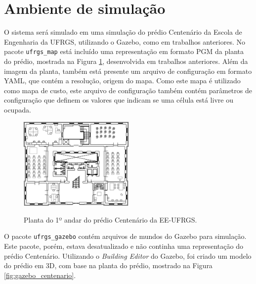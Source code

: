 \documentclass[repeatfields,xlists,xpacks,oneside,yearsonly]{ufrgscca}
\begin{document}
\section{Ambiente de simulação}

O sistema será simulado em uma simulação do prédio Centenário da Escola de Engenharia
da UFRGS, utilizando o Gazebo, como em trabalhos anteriores.
No pacote \texttt{ufrgs\_map} está incluído uma representação em formato PGM da
planta do prédio, mostrada na Figura \ref{fig:planta_centenario}, desenvolvida em
trabalhos anteriores.
Além da imagem da planta, também está presente um arquivo de configuração
em formato YAML, que contém a resolução, origem do mapa.
Como este mapa é utilizado como mapa de custo, este arquivo de configuração
também contém parâmetros de configuração
que definem os valores que indicam se uma célula está livre ou ocupada.

\begin{figure}[h]
    {
        \centering
        \caption{Planta do 1º andar do prédio Centenário da EE-UFRGS.}
        \label{fig:planta_centenario}
        \includegraphics[width=0.5\textwidth]{centenario_floor_plan.png}\\
    }
    {}
\end{figure}

O pacote \texttt{ufrgs\_gazebo} contém arquivos de mundos do Gazebo para
simulação.
Este pacote, porém, estava desatualizado e não continha uma representação do
prédio Centenário.
Utilizando o \textit{Building Editor} do Gazebo, foi criado um modelo do prédio
em 3D, com base na planta do prédio, mostrado na Figura \ref{fig:gazebo_centenario}.
\end{document}
